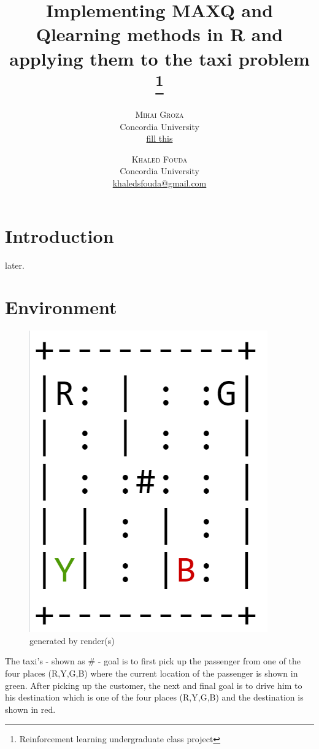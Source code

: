 \documentclass[twoside,twocolumn]{article}
\title{Implementing MAXQ and Qlearning methods in R and applying them to the taxi problem \thanks{Reinforcement learning undergraduate class project}}%
\author{%
\textsc{Mihai Groza} \\[1ex] %
\normalsize Concordia University \\ %
\normalsize \href{mailto:fill this}{fill this} %
\and %
\textsc{Khaled Fouda} \\[1ex] %
\normalsize Concordia University \\ %
\normalsize \href{mailto:khaledsfouda@gmail.com}{khaledsfouda@gmail.com} %
}
\begin{document}
\maketitle


\section{Introduction}
later.
\section{Environment}
\begin{figure}
\centering
\includegraphics[scale=.4]{taxi.png} 
\caption{generated by render(s)}
\end{figure}
The taxi's - shown as \# - goal is to first pick up the passenger from one of the four places (R,Y,G,B) where the current location of the passenger is shown in green. After picking up the customer, the next and final goal is to drive him to his destination which is one of the four places (R,Y,G,B) and the destination is shown in red.\\
\end{document}
